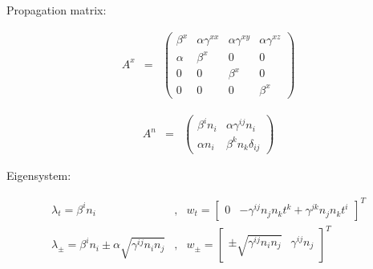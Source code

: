 \documentclass{article}
\begin{document}
   Propagation matrix:

\begin{eqnarray}
   A^x & = & \left( \begin{array}{cccc}
%
   \beta^x & \alpha \gamma^{xx} & \alpha \gamma^{xy} & \alpha
   \gamma^{xz}
\\
   \alpha & \beta^x & 0 & 0
\\
   0 & 0 & \beta^x & 0
\\
   0 & 0 & 0 & \beta^x
%
   \end{array} \right)
\end{eqnarray}

\begin{eqnarray}
   A^n & = & \left( \begin{array}{cc}
%
   \beta^i n_i & \alpha \gamma^{ij} n_i
\\
   \alpha n_i & \beta^k n_k \delta_{ij}
%
   \end{array} \right)
\end{eqnarray}

   Eigensystem:


\begin{eqnarray}
   \lambda_t = \beta^i n_i &, & w_t = \left[ \begin{array}{cccc}
%
   0 & - \gamma^{ij} n_j n_k t^k + \gamma^{jk} n_j n_k t^i
%
   \end{array} \right]^T
\\
   \lambda_\pm = \beta^i n_i \pm \alpha \sqrt{ \gamma^{ij} n_i n_j }
   &, & w_\pm = \left[ \begin{array}{cccc}
%
   \pm \sqrt{ \gamma^{ij} n_i n_j } & \gamma^{ij} n_j
%
   \end{array} \right]^T
\end{eqnarray}
\end{document}
